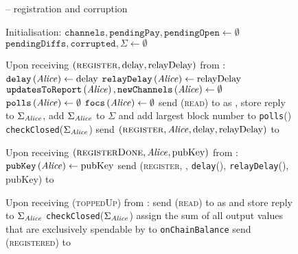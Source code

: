   \begin{figure}[H]
    \begin{systembox}{\fpaynet{} -- registration and corruption}
      \begin{algorithmic}[1]
        \State Initialisation:
        \Indent
          \State $\mathtt{channels}, \mathtt{pendingPay}, \mathtt{pendingOpen}
          \gets \emptyset$
          \State $\texttt{pendingDiffs}, \mathtt{corrupted}, \Sigma \gets
          \emptyset$
        \EndIndent
        \Statex

        \State Upon receiving $\left(\textsc{register}, \mathrm{delay},
        \mathrm{relayDelay}\right)$ from \alice:
        \Indent
          \State $\mathtt{delay}\left(\mathit{Alice}\right) \gets \mathrm{delay}$
          \State $\mathtt{relayDelay}\left(\mathit{Alice}\right) \gets
          \mathrm{relayDelay}$
          \State $\mathtt{updatesToReport}\left(\mathit{Alice}\right),
          \mathtt{newChannels}\left(\mathit{Alice}\right) \gets \emptyset$
          \State $\mathtt{polls}\left(\mathit{Alice}\right) \gets \emptyset$
          \State $\mathtt{focs}\left(\mathit{Alice}\right) \gets \emptyset$
          \State send (\textsc{read}) to \ledger{} as \alice{}, store reply to
          $\Sigma_{\mathit{Alice}}$, add $\Sigma_{\mathit{Alice}}$ to $\Sigma$ and add largest
          block number to \texttt{polls}(\alice)
          \label{alg:fpaynet:support:read}
          \State \texttt{checkClosed}($\Sigma_{\mathit{Alice}}$)
          \State send $\left(\textsc{register}, \mathit{Alice}, \mathrm{delay},
          \mathrm{relayDelay}\right)$ to \simulator
        \EndIndent
        \Statex

        \State Upon receiving $\left(\textsc{registerDone}, \mathit{Alice},
        \mathrm{pubKey}\right)$ from \simulator:
        \Indent
          \State $\mathtt{pubKey}\left(\mathit{Alice}\right) \gets \mathrm{pubKey}$
          \State send (\textsc{register}, \alice, \texttt{delay}(\alice),
          \texttt{relayDelay}(\alice), pubKey) to \alice
        \EndIndent
        \Statex

        \State Upon receiving (\textsc{toppedUp}) from \alice:
        \Indent
          \State send (\textsc{read}) to \ledger{} as \alice{} and store reply
          to $\Sigma_{\mathit{Alice}}$
          \State \texttt{checkClosed}($\Sigma_{\mathit{Alice}}$)
          \State assign the sum of all output values that are exclusively
          spendable by \alice{} to \texttt{onChainBalance}
          \State send (\textsc{registered}) to \alice
        \EndIndent
        \Statex


\end{algorithmic}
\end{systembox}
\end{figure}
